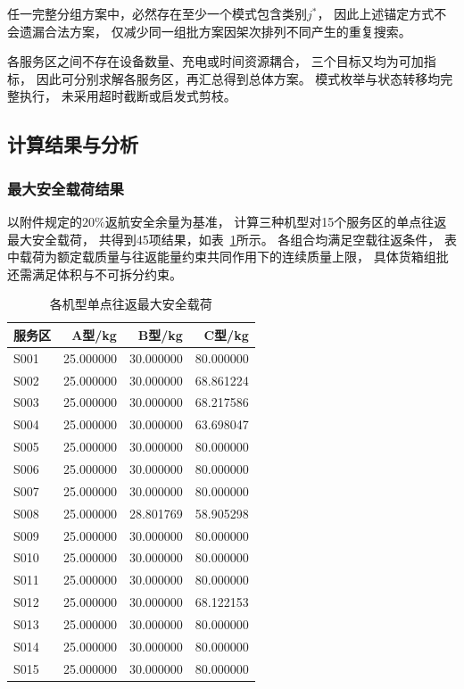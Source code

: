 \documentclass[bwprint]{gmcmthesis}
\begin{document}
任一完整分组方案中，必然存在至少一个模式包含类别$j^{*}$，
因此上述锚定方式不会遗漏合法方案，
仅减少同一组批方案因架次排列不同产生的重复搜索。

各服务区之间不存在设备数量、充电或时间资源耦合，
三个目标又均为可加指标，
因此可分别求解各服务区，再汇总得到总体方案。
模式枚举与状态转移均完整执行，
未采用超时截断或启发式剪枝。

\subsection{计算结果与分析}

\subsubsection{最大安全载荷结果}

以附件规定的$20\%$返航安全余量为基准，
计算三种机型对15个服务区的单点往返最大安全载荷，
共得到45项结果，如表~\ref{tab:q1_safe_payload}所示。
各组合均满足空载往返条件，
表中载荷为额定载质量与往返能量约束共同作用下的连续质量上限，
具体货箱组批还需满足体积与不可拆分约束。

\begin{table}[H]
    \centering
    \caption{各机型单点往返最大安全载荷}
    \label{tab:q1_safe_payload}
    \begin{tabular}{lrrr}
        \toprule
        服务区 & A型/kg & B型/kg & C型/kg \\
        \midrule
        S001 & 25.000000 & 30.000000 & 80.000000 \\
        S002 & 25.000000 & 30.000000 & 68.861224 \\
        S003 & 25.000000 & 30.000000 & 68.217586 \\
        S004 & 25.000000 & 30.000000 & 63.698047 \\
        S005 & 25.000000 & 30.000000 & 80.000000 \\
        S006 & 25.000000 & 30.000000 & 80.000000 \\
        S007 & 25.000000 & 30.000000 & 80.000000 \\
        S008 & 25.000000 & 28.801769 & 58.905298 \\
        S009 & 25.000000 & 30.000000 & 80.000000 \\
        S010 & 25.000000 & 30.000000 & 80.000000 \\
        S011 & 25.000000 & 30.000000 & 80.000000 \\
        S012 & 25.000000 & 30.000000 & 68.122153 \\
        S013 & 25.000000 & 30.000000 & 80.000000 \\
        S014 & 25.000000 & 30.000000 & 80.000000 \\
        S015 & 25.000000 & 30.000000 & 80.000000 \\
        \bottomrule
    \end{tabular}
\end{table}
\end{document}
